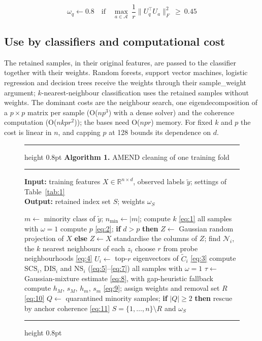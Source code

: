 \documentclass[conference]{IEEEtran}
\begin{document}
\begin{equation}
\omega_q\leftarrow 0.8\quad\text{if}\quad \max_{a\in\mathcal{A}}\ \frac{1}{r}\bigl\|U_q^{\top}U_a\bigr\|_F^{2}\ \ge\ 0.45
\label{eq:11}
\end{equation}

\subsection{Use by classifiers and computational cost}\label{sec:use-by-classifiers-and-computational-cost}

The retained samples, in their original features, are passed to the classifier together with their weights. Random forests, support vector machines, logistic regression and decision trees receive the weights through their sample\_weight argument; $k$-nearest-neighbour classification uses the retained samples without weights. The dominant costs are the neighbour search, one eigendecomposition of a $p \times  p$ matrix per sample (O($np^{3}$) with a dense solver) and the coherence computation (O($nkpr^{2}$)); the bases need O($npr$) memory. For fixed $k$ and $p$ the cost is linear in $n$, and capping $p$ at 128 bounds its dependence on $d$.

\begin{figure}[!t]
\footnotesize
\hrule height 0.8pt\vspace{3pt}
\noindent\textbf{Algorithm 1.} AMEND cleaning of one training fold
\vspace{3pt}\hrule\vspace{3pt}
\noindent\textbf{Input:} training features $X\in\mathbb{R}^{n\times d}$, observed labels $\tilde{y}$; settings of Table~\ref{tab:1}\\
\textbf{Output:} retained index set $S$; weights $\omega_S$
\begin{algorithmic}[1]
\STATE $m\leftarrow$ minority class of $\tilde{y}$; $n_{\min}\leftarrow|m|$; compute $k$ \eqref{eq:1}
 \RETURN all samples with $\omega=1$ \ENDIF
\STATE compute $p$ \eqref{eq:2}; \textbf{if} $d>p$ \textbf{then} $Z\leftarrow$ Gaussian random projection of $X$ \textbf{else} $Z\leftarrow X$
\STATE standardise the columns of $Z$; find $\mathcal{N}_i$, the $k$ nearest neighbours of each $z_i$
\STATE choose $r$ from probe neighbourhoods \eqref{eq:4}
 \STATE $U_i\leftarrow$ top-$r$ eigenvectors of $\tilde{C}_i$ \eqref{eq:3} \ENDFOR
{} \STATE compute $\mathrm{SCS}_i$, $\mathrm{DIS}_i$ and $\mathrm{NS}_i$ (\eqref{eq:5}--\eqref{eq:7}) \ENDFOR
{} \RETURN all samples with $\omega=1$ \ENDIF
\STATE $\tau\leftarrow$ Gaussian-mixture estimate \eqref{eq:8}, with gap-heuristic fallback
\STATE compute $h_M$, $s_M$, $h_m$, $s_m$ \eqref{eq:9}; assign weights and removal set $R$ \eqref{eq:10}
\STATE $Q\leftarrow$ quarantined minority samples; \textbf{if} $|Q|\ge 2$ \textbf{then} rescue by anchor coherence \eqref{eq:11}
\RETURN $S=\{1,\ldots,n\}\setminus R$ and $\omega_S$
\end{algorithmic}
\vspace{2pt}\hrule height 0.8pt
\end{figure}
\end{document}
